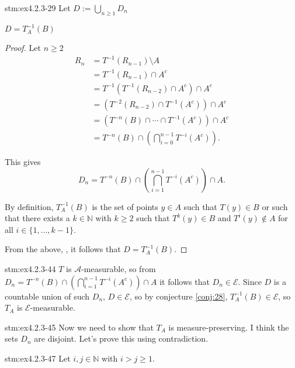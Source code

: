 \begin{statement}{stm:ex4.2.3-29}
Let $D := \bigcup_{n \ge 1} D_n$
\end{statement}

\begin{conj}\label{conj:28}
$D = T_A^{-1}(B)$
\end{conj}

\begin{proof}
Let $n \ge 2$
\begin{align*}
R_n &= T^{-1}(R_{n-1}) \setminus A \\
&= T^{-1}(R_{n-1}) \cap A^c \\
&= T^{-1}(T^{-1}(R_{n-2}) \cap A^c) \cap A^c \\
&= (T^{-2}(R_{n-2}) \cap T^{-1}(A^c)) \cap A^c \\
&= (T^{-n}(B) \cap \cdots \cap T^{-1}(A^c)) \cap A^c \\
&= T^{-n}(B) \cap \left( \bigcap_{i=0}^{n-1} T^{-i}(A^c) \right).
\end{align*}

This gives
\[
D_n = T^{-n}(B) \cap \left( \bigcap_{i=1}^{n-1} T^{-i}(A^c) \right) \cap A.
\]

By definition, $T_A^{-1}(B)$ is the set of points $y \in A$ such that $T(y) \in B$ or such that there exists a $k \in \mathbb{N}$ with $k \ge 2$ such that $T^k(y) \in B$ and $T^i(y) \notin A$ for all $i \in \{1, \ldots, k-1\}$.

From the above, , it follows that $D = T_A^{-1}(B)$.
\end{proof}

\begin{statement}{stm:ex4.2.3-44}
$T$ is $\mathcal{A}$-measurable, so from $D_n = T^{-n}(B) \cap \left( \bigcap_{i=1}^{n-1} T^{-i}(A^c) \right) \cap A$ it follows that $D_n \in \mathcal{E}$. Since $D$ is a countable union of such $D_n$, $D \in \mathcal{E}$, so by conjecture \ref{conj:28}, $T_A^{-1}(B) \in \mathcal{E}$, so $T_A$ is $\mathcal{E}$-measurable.
\end{statement}

\begin{explanation}{stm:ex4.2.3-45}
Now we need to show that $T_A$ is measure-preserving. I think the sets $D_n$ are disjoint. Let's prove this using contradiction.
\end{explanation}

\begin{statement}{stm:ex4.2.3-47}
Let $i, j \in \mathbb{N}$ with $i > j \ge 1$.
\end{statement}

